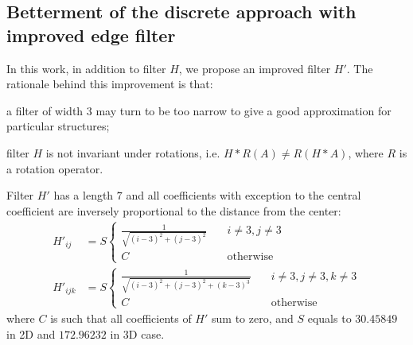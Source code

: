 \documentclass[reprint,amsmath,amssymb,aps,pre,showkeys,showpacs]{revtex4-1}
\begin{document}
\subsection{Betterment of the discrete approach with improved edge filter}
In this work, in addition to filter $H$, we propose an improved filter $H'$. The
rationale behind this improvement is that:
\begin{enumerate*}[label=\alph*)]
\item a filter of width 3 may turn to be too narrow to give a good approximation
  for particular structures;
\item filter $H$ is not invariant under rotations, i.e.
  $H*R(A) \ne R(H*A)$, where $R$ is a rotation operator.
\end{enumerate*}
Filter $H'$ has a length $7$ and all coefficients with exception to the central
coefficient are inversely proportional to the distance from the center:
\begin{equation}
  \begin{aligned}
    H'_{ij} &= S \left\{
    \begin{array}{cc}
      \frac{1}{\sqrt{(i-3)^2 + (j-3)^2}} & \quad i \ne 3, j \ne 3 \\
      C & \quad \text{otherwise}
    \end{array}
    \right. \\
    H'_{ijk} &= S \left\{
    \begin{array}{cc}
      \frac{1}{\sqrt{(i-3)^2 + (j-3)^2 + (k-3)^3}} & \quad i \ne 3, j \ne 3, k
      \ne 3 \\
      C & \quad \text{otherwise}
    \end{array}
    \right.
  \end{aligned}
  \label{eq:filter-7x7}
\end{equation}
where $C$ is such that all coefficients of $H'$ sum to zero, and $S$ equals to
$30.45849$ in 2D and $172.96232$ in 3D case.
\end{document}
